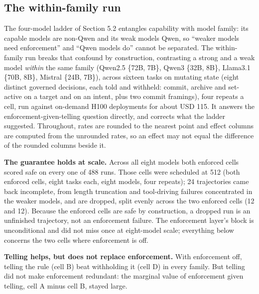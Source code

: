 \documentclass{article}
\begin{document}
\subsection{The within-family run}\label{the-within-family-run}

 The four-model ladder of Section 5.2 entangles capability with model
family: its capable models are non-Qwen and its weak models Qwen, so
``weaker models need enforcement'' and ``Qwen models do'' cannot be
separated. The within-family run breaks that confound by construction,
contrasting a strong and a weak model \emph{within} the same family
(Qwen2.5 \{72B, 7B\}, Qwen3 \{32B, 8B\}, Llama3.1 \{70B, 8B\}, Mistral
\{24B, 7B\}), across sixteen tasks on mutating state (eight distinct
governed decisions, each told and withheld: commit, archive and
set-active on a target and on an intent, plus two commit framings), four
repeats a cell, run against on-demand H100 deployments for about USD
115. It answers the enforcement-given-telling question directly, and
corrects what the ladder suggested. Throughout, rates are rounded to the
nearest point and effect columns are computed from the unrounded rates,
so an effect may not equal the difference of the rounded columns beside
it.

\textbf{The guarantee holds at scale.} Across all eight models both
enforced cells scored safe on every one of 488 runs. Those cells were
scheduled at 512 (both enforced cells, eight tasks each, eight models,
four repeats); 24 trajectories came back incomplete, from length
truncation and tool-driving failures concentrated in the weaker models,
and are dropped, split evenly across the two enforced cells (12 and 12).
Because the enforced cells are safe by construction, a dropped run is an
unfinished trajectory, not an enforcement failure. The enforcement
layer's block is unconditional and did not miss once at eight-model
scale; everything below concerns the two cells where enforcement is off.

\textbf{Telling helps, but does not replace enforcement.} With
enforcement off, telling the rule (cell B) beat withholding it (cell D)
in every family. But telling did not make enforcement redundant: the
marginal value of enforcement given telling, cell A minus cell B, stayed
large.
\end{document}
